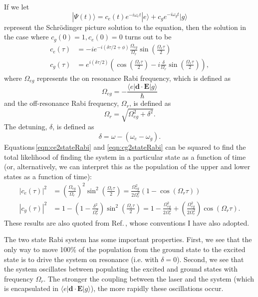 If we let 
\begin{equation}
|\Psi(t)\rangle = c_e(t)e^{-i\omega_e t}|e\rangle + c_g e^{-i\omega_g t}|g\rangle
\end{equation}
represent the Schr\"odinger picture solution to the equation, then the solution in the case where $c_g(0)=1,c_e(0)=0$ turns out to be 
\begin{align}
c_e(\tau)&=-i e^{-i(\delta \tau/2+\phi)} \frac{\Omega_{eg}}{\Omega_{r}} \sin\left(\frac{\Omega_r \tau}{2}\right)\label{eqn:ce2stateRabi}\\
c_g(\tau)&=e^{i(\delta \tau/2)} \left(
\cos\left(\frac{\Omega_r \tau}{2}\right)
- i\frac{\delta}{\Omega_r} \sin\left(\frac{\Omega_r \tau}{2}\right)\right)
\label{eqn:cg2stateRabi},
\end{align}
where $\Omega_{eg}$ represents the on resonance Rabi frequency, which is defined as 
\begin{equation}
\Omega_{eg}=-\frac{\langle e |\mathbf{d}\cdot\mathbf{E}|g \rangle }{\hbar}
\end{equation}
and the off-resonance Rabi frequency, $\Omega_r$, is defined as 
\begin{equation}
\Omega_r=\sqrt{\Omega_{eg}^2+\delta^2}.
\end{equation}
The detuning, $\delta$, is defined as 
\begin{equation}
\delta=\omega-(\omega_e-\omega_g).
\end{equation}
Equations\,\ref{eqn:ce2stateRabi} and \ref{eqn:cg2stateRabi} can be squared to find the total likelihood of finding the system in a particular state as a function of time (or, alternatively, we can interpret this as the population of the upper and lower states as a function of time):
\begin{align}
|c_e(\tau)|^2&=\left(\frac{\Omega_{eg}}{\Omega_r}\right)^2 \sin^2\left(\frac{\Omega_r\tau}{2}\right)
=\frac{\Omega_{eg}^2}{2\Omega_r^2}(1-\cos(\Omega_r\tau))\\
|c_g(\tau)|^2&=1-\left(1-\frac{\delta^2}{\Omega_r^2}\right)\sin^2
\left(\frac{\Omega_r \tau}{2}\right)
=1-\frac{\Omega_{eg}^2}{2\Omega_r^2} + \left(\frac{\Omega_{eg}^2}{2\Omega_r^2}\right)\cos(\Omega_r \tau).
\end{align}
These results are also quoted from Ref.\,\cite{Young1997363}, whose conventions I have also adopted.

The two state Rabi system has some important properties. First, we see that the only way to move 100\% of the population from the ground state to the excited state is to drive the system on resonance (i.e. with $\delta=0$). Second, we see that the system oscillates between populating the excited and ground states with frequency $\Omega_{r}$. The stronger the coupling between the laser and the system (which is encapsulated in $\langle e|\mathbf{d}\cdot\mathbf{E}|g\rangle$), the more rapidly these oscillations occur. 

